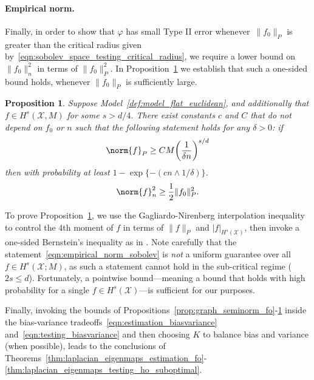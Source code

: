 \documentclass{article}
\newcommand{\1}{\mathbf{1}}
\newcommand{\Xset}{\mathcal{X}}
\newcommand{\mc}[1]{\mathcal{#1}}
\theoremstyle{alden}
\theoremstyle{aldenthm}
\newtheorem{proposition}{Proposition}
\theoremstyle{definition}
\theoremstyle{remark}
\begin{document}
\paragraph{Empirical norm.}
Finally, in order to show that $\varphi$ has small Type II error whenever~$\|f_0\|_P$ is greater than the critical radius given by~\eqref{eqn:sobolev_space_testing_critical_radius}, we require a lower bound on $\|f_0\|_n^2$ in terms of $\|f_0\|_P^2$. In Proposition~\ref{prop:empirical_norm_sobolev} we establish that such a one-sided bound holds, whenever $\|f_0\|_P$ is sufficiently large.
\begin{proposition}
	\label{prop:empirical_norm_sobolev}
	Suppose Model~\ref{def:model_flat_euclidean}, and additionally that $f \in H^s(\Xset,M)$ for some $s > d/4$. There exist constants $c$ and $C$ that do not depend on $f_0$ or $n$ such that the following statement holds for any $\delta > 0$:  if
	\begin{equation}
	\label{eqn:empirical_norm_sobolev_1}
	\norm{f}_{P} \geq C M \biggl(\frac{1}{\delta n}\biggr)^{s/d}
	\end{equation}
	then with probability at least $1 - \exp\{-(cn \wedge 1/\delta)\}$.
	\begin{equation}
	\label{eqn:empirical_norm_sobolev}
	\norm{f}_n^2 \geq \frac{1}{2} \|f_0\|_P^2.
	\end{equation}
\end{proposition}
To prove Proposition~\ref{prop:empirical_norm_sobolev}, we use the Gagliardo-Nirenberg interpolation inequality to control the $4$th moment of $f$ in terms of $\|f\|_P$ and $|f|_{H^s(\mc{X})}$, then invoke a one-sided Bernstein's inequality as in \cite[Section 14.2]{wainwright2019}. Note carefully that the statement~\eqref{eqn:empirical_norm_sobolev} is \emph{not} a uniform guarantee over all $f \in H^s(\mc{X};M)$, as such a statement cannot hold in the sub-critical regime ($2s \leq d$). Fortunately, a pointwise bound---meaning a bound that holds with high probability for a single $f \in H^s(\mc{X})$---is sufficient for our purposes.

Finally, invoking the bounds of Propositions~\ref{prop:graph_seminorm_fo}-\ref{prop:empirical_norm_sobolev} inside the bias-variance tradeoffs~\eqref{eqn:estimation_biasvariance} and~\eqref{eqn:testing_biasvariance} and then choosing $K$ to balance bias and variance (when possible), leads to the conclusions of Theorems~\ref{thm:laplacian_eigenmaps_estimation_fo}-\ref{thm:laplacian_eigenmaps_testing_ho_suboptimal}.
\end{document}
